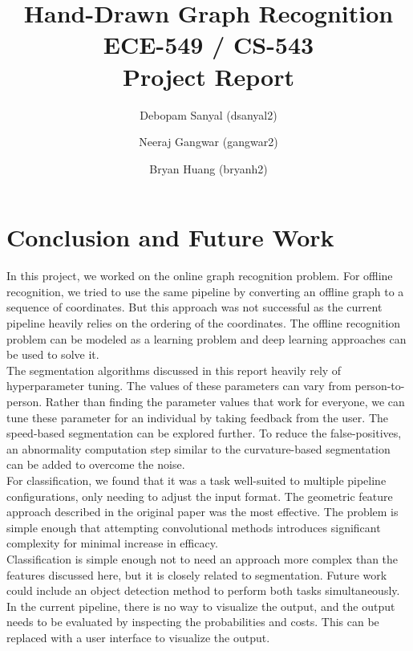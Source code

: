\documentclass[10pt, twocolumn,letterpaper]{article}
\title{Hand-Drawn Graph Recognition\\
	ECE-549 / CS-543\\
	Project Report}
\author{Debopam Sanyal (dsanyal2) \and Neeraj Gangwar (gangwar2) \and Bryan Huang (bryanh2)}
\begin{document}
	\maketitle
	
	
	
	
	
	
	
	
	
	\section{Conclusion and Future Work}
	In this project, we worked on the online graph recognition problem. For offline recognition, we tried to use the same pipeline by converting an offline graph to a sequence of coordinates. But this approach was not successful as the current pipeline heavily relies on the ordering of the coordinates. The offline recognition problem can be modeled as a learning problem and deep learning approaches can be used to solve it.\\
	
	The segmentation algorithms discussed in this report heavily rely of hyperparameter tuning. The values of these parameters can vary from person-to-person. Rather than finding the parameter values that work for everyone, we can tune these parameter for an individual by taking feedback from the user. The speed-based segmentation can be explored further. To reduce the false-positives, an abnormality computation step similar to the curvature-based segmentation can be added to overcome the noise.\\
	
	For classification, we found that it was a task well-suited to multiple pipeline configurations, only needing to adjust the input format. The geometric feature approach described in the original paper was the most effective. The problem is simple enough that attempting convolutional methods introduces significant complexity for minimal increase in efficacy.\\
    
    Classification is simple enough not to need an approach more complex than the features discussed here, but it is closely related to segmentation. Future work could include an object detection method to perform both tasks simultaneously.\\
    
    In the current pipeline, there is no way to visualize the output, and the output needs to be evaluated by inspecting the probabilities and costs. This can be replaced with a user interface to visualize the output. 
	
\end{document}
